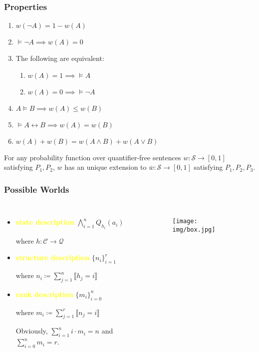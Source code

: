 \documentclass[UTF8,11pt,colorlinks,compress,openany]{beamer}%
\begin{document}
\begin{frame}\frametitle{Properties}
\setlength\abovedisplayskip{0pt}
\setlength\belowdisplayskip{0pt}
	\begin{theorem}
		\begin{enumerate}[i]
			\item $w(\neg A)=1-w(A)$
			\item $\vDash\neg A\implies w(A)=0$
			\item The following are equivalent:
			\begin{enumerate}[1.]
				\item $w(A)=1 \implies \vDash A$
				\item $w(A)=0 \implies \vDash\neg A$
			\end{enumerate}
			\item $A\vDash B\implies w(A)\leq w(B)$
			\item $\vDash A\leftrightarrow B\implies w(A)=w(B)$
			\item $w(A)+w(B)=w(A\wedge B)+w(A\vee B)$
		\end{enumerate}
	\end{theorem}
	\begin{theorem}\label{extensionthm}
		For any probability function over quantifier-free sentences $w: \mathcal{S}\to[0,1]$ satisfying $P_1,P_2$, $w$ has an unique extension to $\overline{w}:\mathcal{S}\to[0,1]$ satisfying $P_1,P_2,P_3$.
	\end{theorem}
\end{frame}

\begin{frame}\frametitle{Possible Worlds}
\begin{columns}[onlytextwidth]
\begin{itemize}
\item \textcolor{yellow}{\textbf{state description}} $\bigwedge\limits_{i=1}^n Q_{h_i}(a_i)$

	where $h: \mathcal{C}\to \mathcal{Q}$
\item \textcolor{yellow}{\textbf{structure description}} $\{n_i\}_{i=1}^r$

	where $n_i\coloneqq \sum\limits_{j=1}^n\llbracket h_j=i\rrbracket$
\item \textcolor{yellow}{\textbf{rank description}} $\{m_i\}_{i=0}^n$

	where $m_i\coloneqq \sum\limits_{j=1}^r\llbracket n_j=i\rrbracket$
	
	Obviously, $\sum\limits_{i=1}^n i\cdot m_i=n$ and $\sum\limits_{i=0}^n m_i=r$.
\end{itemize}
	\begin{figure}
		\texttt{[image: img/box.jpg]}
	\end{figure}
\end{columns}
\end{frame}
\end{document}
